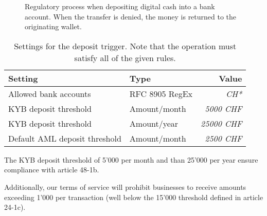 \begin{figure}[h!]
\begin{center}
  \end{center}
  \caption{Regulatory process when depositing digital cash into a bank
    account.  When the transfer is denied, the money is returned to the
    originating wallet.}
\end{figure}


\begin{table}[h!]
  \caption{Settings for the deposit trigger. Note that the operation
  must satisfy all of the given rules.}
  \begin{tabular}{l|l|r}
    {\bf Setting}                 & {\bf Type}         & {\bf Value}    \\ \hline \hline
    Allowed bank accounts         & RFC 8905 RegEx     & {\em CH*}      \\ \hline
    KYB deposit threshold         & Amount/month       & {\em  5000 CHF} \\
    KYB deposit threshold         & Amount/year        & {\em 25000 CHF} \\
    Default AML deposit threshold & Amount/month       & {\em  2500 CHF} \\
  \end{tabular}
\end{table}

The KYB deposit threshold of 5'000 \CURRENCY{} per month and than 25'000
\CURRENCY{} per year ensure compliance with article 48-1b.

Additionally, our terms of service will prohibit businesses to receive
amounts exceeding 1'000 \CURRENCY{} per transaction (well below the
15'000 \CURRENCY{} threshold defined in article 24-1c).
